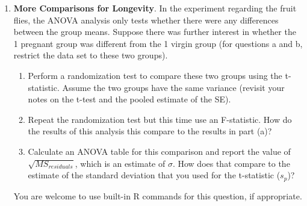 \documentclass[
  letterpaper,
  DIV=11,
  numbers=noendperiod]{scrartcl}
\begin{document}
\begin{enumerate}
\def\labelenumi{\arabic{enumi}.}
\setcounter{enumi}{1}
\item
  \textbf{More Comparisons for Longevity}. In the experiment regarding
  the fruit flies, the ANOVA analysis only tests whether there were any
  differences between the group means. Suppose there was further
  interest in whether the 1 pregnant group was different from the 1
  virgin group (for questions a and b, restrict the data set to these
  two groups).

  \begin{enumerate}
  \def\labelenumii{\alph{enumii}.}
  \item
    Perform a randomization test to compare these two groups using the
    t-statistic. Assume the two groups have the same variance (revisit
    your notes on the t-test and the pooled estimate of the SE).
  \item
    Repeat the randomization test but this time use an F-statistic. How
    do the results of this analysis this compare to the results in part
    (a)?
  \item
    Calculate an ANOVA table for this comparison and report the value of
    \(\sqrt{MS_{residuals}}\), which is an estimate of \(\sigma\). How
    does that compare to the estimate of the standard deviation that you
    used for the t-statistic (\(s_{p}\))?
  \end{enumerate}

  You are welcome to use built-in R commands for this question, if
  appropriate.
\end{enumerate}

\newpage{}
\end{document}
